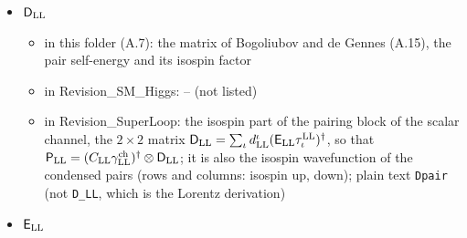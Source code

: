 \documentclass[
  10pt,
]{article}
\providecommand{\tightlist}{%
  \setlength{\itemsep}{0pt}\setlength{\parskip}{0pt}}
\begin{document}
\begin{itemize}
  \begin{itemize}
  \tightlist
  \item
    in this folder (B.7): the normal and the pair correlation matrix,
    that of the normal vacuum (B.2), and the local matrices of (B.13)
  \item
    in Revision\_SM\_Higgs: the correlation matrices of a uniform state:
    \((\mathsf C^{\rm n}_{\rm LL})_{cc'}=\langle\Psi^\dagger_{{\rm LL},c'}\Psi_{{\rm LL},c}\rangle\)
    (normal, Hermitian) and
    \((\mathsf C^{\rm p}_{\rm LL})_{cc'}=\langle\Psi_{{\rm LL},c}\Psi_{{\rm LL},c'}\rangle\)
    (pair, antisymmetric), both fields at one point, and the normal
    correlation matrix of the normal vacuum; with the argument
    \(\vec q_{\rm LL}\), their parts of one momentum
  \item
    in Revision\_SuperLoop: the correlation matrices of a state that is
    the same at every point of space, \(8\times8\) matrices with the
    entries
    \((\mathsf C^{\rm n}_{\rm LL})_{ab}=\langle\Psi^\dagger_{{\rm LL},b}\Psi_{{\rm LL},a}\rangle\)
    (normal; Hermitian) and
    \((\mathsf C^{\rm p}_{\rm LL})_{ab}=\langle\Psi_{{\rm LL},a}\Psi_{{\rm LL},b}\rangle\)
    (pair; antisymmetric), the two fields at the same point and time;
    with the argument \(\vec q_{\rm LL}\) their parts of one momentum,
    of which they are the integrals
    \(\int_{q_{\rm LL}<\Lambda_{\rm LL}}d^3q_{\rm LL}(2\pi)^{-3}\); the
    normal correlation matrix of the vacuum; and the density matrix of
    the Nambu spinor at one momentum, the \(16\times16\) matrix with the
    entries
    \(\langle\mathcal N^\dagger_{{\rm LL},b}\mathcal N_{{\rm LL},a}\rangle\),
    whose upper left block is
    \(\mathsf C^{\rm n}_{\rm LL}(\vec q_{\rm LL})\) and whose upper
    right block is \(-\mathsf C^{\rm p}_{\rm LL}(\vec q_{\rm LL})\)
  \end{itemize}
\item
  \(\mathsf D_{\rm LL}\)

  \begin{itemize}
  \tightlist
  \item
    in this folder (A.7): the matrix of Bogoliubov and de Gennes (A.15),
    the pair self-energy and its isospin factor
  \item
    in Revision\_SM\_Higgs: -- (not listed)
  \item
    in Revision\_SuperLoop: the isospin part of the pairing block of the
    scalar channel, the \(2\times2\) matrix
    \(\mathsf D_{\rm LL}=\sum_\iota d^\iota_{\rm LL}(\mathsf E_{\rm LL}\tau^{\rm LL}_\iota)^\dagger\),
    so that
    \(\mathsf P_{\rm LL}=(C_{\rm LL}\gamma^{\rm ch}_{\rm LL})^\dagger\otimes\mathsf D_{\rm LL}\);
    it is also the isospin wavefunction of the condensed pairs (rows and
    columns: isospin up, down); plain text \texttt{Dpair} (not
    \texttt{D\_LL}, which is the Lorentz derivation)
  \end{itemize}
\item
  \(\mathsf E_{\rm LL}\)


\end{itemize}
\end{document}
